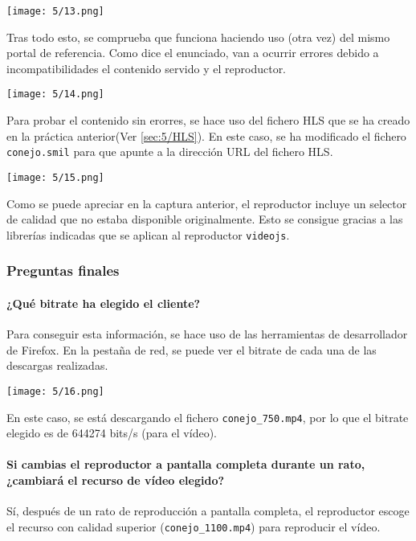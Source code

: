 \begin{minipage}{\linewidth}
	\centering
	\texttt{[image: 5/13.png]}
	\label{fig:5/13}
\end{minipage}

Tras todo esto, se comprueba que funciona haciendo uso (otra vez) del mismo portal de
referencia. Como dice el enunciado, van a ocurrir errores debido a incompatibilidades
el contenido servido y el reproductor.

\begin{minipage}{\linewidth}
	\centering
	\texttt{[image: 5/14.png]}
	\label{fig:5/14}
\end{minipage}

Para probar el contenido sin erorres, se hace uso del fichero HLS que se ha creado
en la práctica anterior(Ver \ref{sec:5/HLS}). En este caso, se ha modificado el fichero \Verb#conejo.smil#
para que apunte a la dirección URL del fichero HLS{.}

\begin{minipage}{\linewidth}
	\centering
	\texttt{[image: 5/15.png]}
	\label{fig:5/15}
\end{minipage}

Como se puede apreciar en la captura anterior, el reproductor incluye un selector
de calidad que no estaba disponible originalmente. Esto se consigue gracias a las
librerías indicadas que se aplican al reproductor \Verb#videojs#.

\subsubsection{Preguntas finales}
\paragraph{¿Qué bitrate ha elegido el cliente?}
Para conseguir esta información, se hace uso de las herramientas de desarrollador
de Firefox. En la pestaña de red, se puede ver el bitrate de cada una de las
descargas realizadas.

\begin{minipage}{\linewidth}
	\centering
	\texttt{[image: 5/16.png]}
	\label{fig:5/16}
\end{minipage}

En este caso, se está descargando el fichero \Verb#conejo_750.mp4#, por lo que
el bitrate elegido es de 644274 bits/s (para el vídeo).

\paragraph{Si cambias el reproductor a pantalla completa durante un rato, ¿cambiará el recurso de vídeo elegido?}
Sí, después de un rato de reproducción a pantalla completa, el reproductor escoge el recurso
con calidad superior (\Verb#conejo_1100.mp4#) para reproducir el vídeo.
